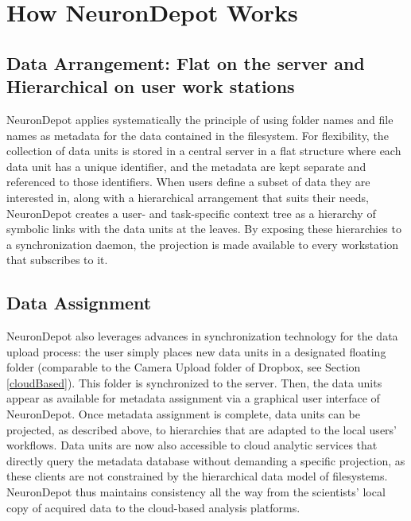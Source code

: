 \documentclass{frontiersSCNS} %
\begin{document}

\section{How NeuronDepot Works}

\subsection{Data Arrangement: Flat on the server and Hierarchical on user work
stations}

NeuronDepot applies systematically the principle of using folder names and file
names as metadata for the data contained in the filesystem. For flexibility,
the collection of data units is stored in a central server in a flat structure
where each data unit has a unique identifier, and the metadata are kept separate
and referenced to those identifiers. When users define a subset of data they
are interested in, along with a hierarchical arrangement that suits their
needs, NeuronDepot creates a user- and task-specific context tree as a
hierarchy of symbolic links with the data units at the leaves. By exposing
these hierarchies to a synchronization daemon, the projection is made available
to every workstation that subscribes to it.

\subsection{Data Assignment}

NeuronDepot also leverages advances in synchronization technology for the data
upload process: the user simply places new data units in a designated floating
folder (comparable to the Camera Upload folder of Dropbox, see Section
\ref{cloudBased}). This folder is
synchronized to the server. Then, the data units appear as available for
metadata assignment via a graphical user interface of NeuronDepot. Once
metadata assignment is complete, data units can be projected, as described
above, to hierarchies that are adapted to the local users' workflows. Data
units are now also accessible to cloud analytic services that directly query
the metadata database without demanding a specific projection, as these clients
are not constrained by the hierarchical data model of filesystems. NeuronDepot
thus maintains consistency all the way from the scientists' local copy of
acquired data to the cloud-based analysis platforms.
\end{document}
